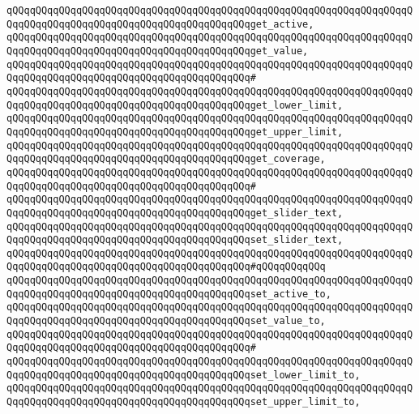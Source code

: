 \verb|qQQqqQQqqQQqqQQqqQQqqQQqqQQqqQQqqQQqqQQqqQQqqQQqqQQqqQQqqQQqqQQqqQQqqQQqqQQqqQQqqQQqqQQqqQQqqQQqqQQqqQQqqQQqqQQqget_active,|\newline
\verb|qQQqqQQqqQQqqQQqqQQqqQQqqQQqqQQqqQQqqQQqqQQqqQQqqQQqqQQqqQQqqQQqqQQqqQQqqQQqqQQqqQQqqQQqqQQqqQQqqQQqqQQqqQQqqQQqget_value,|\newline
\verb|qQQqqQQqqQQqqQQqqQQqqQQqqQQqqQQqqQQqqQQqqQQqqQQqqQQqqQQqqQQqqQQqqQQqqQQqqQQqqQQqqQQqqQQqqQQqqQQqqQQqqQQqqQQqqQQq#|\newline
\verb|qQQqqQQqqQQqqQQqqQQqqQQqqQQqqQQqqQQqqQQqqQQqqQQqqQQqqQQqqQQqqQQqqQQqqQQqqQQqqQQqqQQqqQQqqQQqqQQqqQQqqQQqqQQqqQQqget_lower_limit,|\newline
\verb|qQQqqQQqqQQqqQQqqQQqqQQqqQQqqQQqqQQqqQQqqQQqqQQqqQQqqQQqqQQqqQQqqQQqqQQqqQQqqQQqqQQqqQQqqQQqqQQqqQQqqQQqqQQqqQQqget_upper_limit,|\newline
\verb|qQQqqQQqqQQqqQQqqQQqqQQqqQQqqQQqqQQqqQQqqQQqqQQqqQQqqQQqqQQqqQQqqQQqqQQqqQQqqQQqqQQqqQQqqQQqqQQqqQQqqQQqqQQqqQQqget_coverage,|\newline
\verb|qQQqqQQqqQQqqQQqqQQqqQQqqQQqqQQqqQQqqQQqqQQqqQQqqQQqqQQqqQQqqQQqqQQqqQQqqQQqqQQqqQQqqQQqqQQqqQQqqQQqqQQqqQQqqQQq#|\newline
\verb|qQQqqQQqqQQqqQQqqQQqqQQqqQQqqQQqqQQqqQQqqQQqqQQqqQQqqQQqqQQqqQQqqQQqqQQqqQQqqQQqqQQqqQQqqQQqqQQqqQQqqQQqqQQqqQQqget_slider_text,|\newline
\newline
\verb|qQQqqQQqqQQqqQQqqQQqqQQqqQQqqQQqqQQqqQQqqQQqqQQqqQQqqQQqqQQqqQQqqQQqqQQqqQQqqQQqqQQqqQQqqQQqqQQqqQQqqQQqqQQqqQQqset_slider_text,|\newline
\verb|qQQqqQQqqQQqqQQqqQQqqQQqqQQqqQQqqQQqqQQqqQQqqQQqqQQqqQQqqQQqqQQqqQQqqQQqqQQqqQQqqQQqqQQqqQQqqQQqqQQqqQQqqQQqqQQq#qQQqqQQqqQQq|\newline
\verb|qQQqqQQqqQQqqQQqqQQqqQQqqQQqqQQqqQQqqQQqqQQqqQQqqQQqqQQqqQQqqQQqqQQqqQQqqQQqqQQqqQQqqQQqqQQqqQQqqQQqqQQqqQQqqQQqset_active_to,|\newline
\verb|qQQqqQQqqQQqqQQqqQQqqQQqqQQqqQQqqQQqqQQqqQQqqQQqqQQqqQQqqQQqqQQqqQQqqQQqqQQqqQQqqQQqqQQqqQQqqQQqqQQqqQQqqQQqqQQqset_value_to,|\newline
\verb|qQQqqQQqqQQqqQQqqQQqqQQqqQQqqQQqqQQqqQQqqQQqqQQqqQQqqQQqqQQqqQQqqQQqqQQqqQQqqQQqqQQqqQQqqQQqqQQqqQQqqQQqqQQqqQQq#|\newline
\verb|qQQqqQQqqQQqqQQqqQQqqQQqqQQqqQQqqQQqqQQqqQQqqQQqqQQqqQQqqQQqqQQqqQQqqQQqqQQqqQQqqQQqqQQqqQQqqQQqqQQqqQQqqQQqqQQqset_lower_limit_to,|\newline
\verb|qQQqqQQqqQQqqQQqqQQqqQQqqQQqqQQqqQQqqQQqqQQqqQQqqQQqqQQqqQQqqQQqqQQqqQQqqQQqqQQqqQQqqQQqqQQqqQQqqQQqqQQqqQQqqQQqset_upper_limit_to,|\newline
